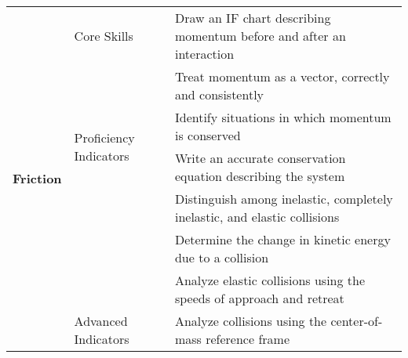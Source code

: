 \centering
{\footnotesize \begin{tabular}{| p{.35 cm} | p{1.7 cm} | p{14.3 cm} | }
\hline
\multirow{8}{*}{\begin{sideways}\parbox{4mm}{{\large{\bf Friction}}}\end{sideways}}  &Core Skills 		& Draw an IF chart describing momentum before and after an interaction  \\ \cline{3-3}
& 					& Treat momentum as a vector, correctly and consistently  \\ \cline{2-3}					
& \multirow{2}{*}{\parbox{1.7cm}{Proficiency Indicators}}	& Identify situations in which momentum is conserved \\ \cline{3-3}
&					& Write an accurate conservation equation describing the system \\ \cline{3-3}
& 					& Distinguish among inelastic, completely inelastic, and elastic collisions \\ \cline{3-3}
& 					& Determine the change in kinetic energy due to a collision \\ \cline{3-3}
&					& Analyze elastic collisions using the speeds of approach and retreat \\ \cline{2-3}
& Advanced Indicators	& Analyze collisions using the center-of-mass reference frame \\ \hline
\end{tabular} }
\vspace{2 mm}



